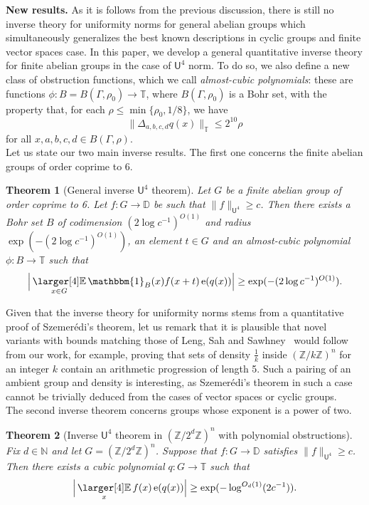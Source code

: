 \documentclass[a4paper,11pt]{article}
\newtheorem{theorem}{Theorem}
\numberwithin{theorem}{section}
\theoremstyle{definition}
\newcommand\id{\mathbbm{1}}
\newcommand{\on}[1]{
	\operatorname{#1}
}
\newcommand{\exx}{
  \mathop{
    \mathchoice{\vcenter{\hbox{\larger[4]$\mathbb{E}$}}}
               {\kern0pt\mathbb{E}}
               {\kern0pt\mathbb{E}}
               {\kern0pt\mathbb{E}}
  }\displaylimits
}
\begin{document}
\noindent\textbf{New results.} As it is follows from the previous discussion, there is still no inverse theory for uniformity norms for general abelian groups which simultaneously generalizes the best known descriptions in cyclic groups and finite vector spaces case. In this paper, we develop a general quantitative inverse theory for finite abelian groups in the case of $\mathsf{U}^4$ norm. To do so, we also define a new class of obstruction functions, which we call \textit{almost-cubic polynomials}: these are functions $\phi : B = B(\Gamma, \rho_0) \to \mathbb{T}$, where $B(\Gamma, \rho_0)$ is a Bohr set, with the property that, for each $\rho \leq \min\{\rho_0,1/8\}$, we have
\[\|\Delta_{a,b,c,d} q(x)\|_{\mathbb{T}} \leq  2^{10} \rho\]
for all $x, a,b,c,d \in B(\Gamma, \rho)$.\\

Let us state our two main inverse results. The first one concerns the finite abelian groups of order coprime to 6.

\begin{theorem}[General inverse $\mathsf{U}^4$ theorem]\label{genu4introduction}
     Let $G$ be a finite abelian group of order coprime to 6. Let $f : G \to \mathbb{D}$ be such that $\|f\|_{\mathsf{U}^4} \geq c$. Then there exists a Bohr set $B$ of codimension $(2 \log c^{-1})^{O(1)}$ and radius $\exp(-(2 \log c^{-1})^{O(1)})$, an element $t \in G$ and an almost-cubic polynomial $\phi : B  \to \mathbb{T}$ such that 
    \[\Big|\exx_{x \in G} \id_{B}(x) f(x + t) \on{e}(q(x))\Big| \geq \exp(-(2 \log c^{-1})^{O(1)}).\]
\end{theorem}

Given that the inverse theory for uniformity norms stems from a quantitative proof of Szemer\'edi's theorem, let us remark that it is plausible that novel variants with bounds matching those of Leng, Sah and Sawhney~\cite{LengSahSawhneykAP} would follow from our work, for example, proving that sets of density $\frac{1}{k}$ inside $(\mathbb{Z}/k\mathbb{Z})^n$ for an integer $k$ contain an arithmetic progression of length 5. Such a pairing of an ambient group and density is interesting, as Szemer\'edi's theorem in such a case cannot be trivially deduced from the cases of vector spaces or cyclic groups.\\

The second inverse theorem concerns groups whose exponent is a power of two.\\

\begin{theorem}[Inverse $\mathsf{U}^4$ theorem in $(\mathbb{Z}/2^d\mathbb{Z})^n$ with polynomial obstructions]\label{abelian2groupscaseintroduction}
    Fix $d \in \mathbb{N}$ and let $G = (\mathbb{Z}/2^d\mathbb{Z})^n$. Suppose that $f : G \to \mathbb{D}$ satisfies $\|f\|_{\mathsf{U}^4} \geq c$. Then there exists a cubic polynomial $q : G \to \mathbb{T}$ such that 
    \[\Big|\exx_{x} f(x) \on{e}(q(x))\Big| \geq \exp(-\log^{O_d(1)}(2c^{-1})).\]
\end{theorem}
\end{document}
